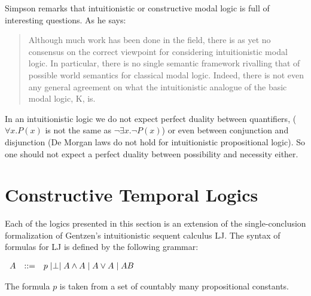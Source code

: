\documentclass{article}
\let\to\relax
\newcommand{\to}{\rightarrow}
\begin{document}
 Simpson remarks that intuitionistic or constructive modal logic is
 full of interesting questions. As he says:
\begin{quote}
Although much work has been done in the field, there is as yet no
consensus on the correct viewpoint for considering intuitionistic
modal logic.  In particular, there is no single semantic framework
rivalling that of possible world semantics for classical modal logic.
Indeed, there is not even any general agreement on what the
intuitionistic analogue of the basic modal logic, K, is.
\end{quote}
In an intuitionistic logic we do not expect perfect duality between
quantifiers, ($\forall x.P(x)$ is not the same as $\neg \exists x.\neg
P(x)$) or even between conjunction and disjunction (De Morgan laws do
not hold for intuitionistic propositional logic). So one should not
expect a perfect duality between possibility and necessity either.

\section{Constructive Temporal Logics}

Each of the logics presented in this section is an extension of the
single-conclusion formalization of Gentzen's intuitionistic sequent
calculus LJ.  The syntax of formulas for LJ is defined by the
following grammar:
\begin{center}
    \begin{math}
        \begin{array}{lllllllll}
            A & ::= & p \mid \perp \mid A \land A \mid A \lor A \mid A \to B
        \end{array}
    \end{math}
\end{center}
The formula $p$ is taken from a set of countably many propositional
constants.
\end{document}
